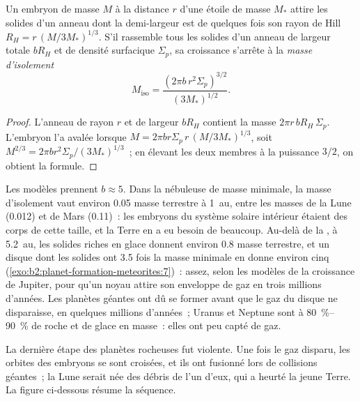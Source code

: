 \begin{proposition}\label{prop:b2:planet-formation-meteorites:isolation}
Un embryon de masse $M$ à la distance $r$ d'une étoile de masse $M_*$ attire les
solides d'un anneau dont la demi-largeur est de quelques fois son rayon de Hill
$R_H = r\,(M/3M_*)^{1/3}$. S'il rassemble tous les solides d'un anneau de largeur
totale $bR_H$ et de densité surfacique $\Sigma_p$, sa croissance s'arrête à la
\emph{masse d'isolement}
\[
  M_{\mathrm{iso}} = \frac{(2\pi b\, r^2 \Sigma_p)^{3/2}}{(3M_*)^{1/2}} .
\]
\end{proposition}

\begin{proof}
L'anneau de rayon $r$ et de largeur $bR_H$ contient la masse
$2\pi r\, bR_H\,\Sigma_p$. L'embryon l'a avalée lorsque
$M = 2\pi b r\Sigma_p\, r\,(M/3M_*)^{1/3}$, soit
$M^{2/3} = 2\pi b r^2\Sigma_p/(3M_*)^{1/3}$~; en élevant les deux membres
à la puissance $3/2$, on obtient la formule.
\end{proof}

Les modèles prennent $b \approx 5$. Dans la nébuleuse de masse minimale, la masse d'isolement vaut
environ \num{0.05} masse terrestre à \qty{1}{au}, entre les masses de la Lune (\num{0.012}) et de
Mars (\num{0.11})~: les embryons du système solaire intérieur étaient des corps de cette taille, et la
Terre en a eu besoin de beaucoup. Au-delà de la , à \qty{5.2}{au}, les solides riches en
glace donnent environ \num{0.8} masse terrestre, et un disque dont les solides ont \num{3.5} fois la
masse minimale en donne environ cinq (\cref{exo:b2:planet-formation-meteorites:7})~: assez, selon les
modèles de la croissance de Jupiter, pour qu'un noyau attire son enveloppe de gaz en trois millions
d'années. Les planètes géantes ont dû se former avant que le gaz du disque ne disparaisse, en quelques
millions d'années~; Uranus et Neptune sont à \qtyrange{80}{90}{\percent} de roche et de glace en masse~:
elles ont peu capté de gaz.

La dernière étape des planètes rocheuses fut violente. Une fois le gaz disparu, les
orbites des embryons se sont croisées, et ils ont fusionné lors de collisions
géantes~; la Lune serait née des débris de l'un d'eux, qui a heurté la jeune Terre.
La figure ci-dessous résume la séquence.

